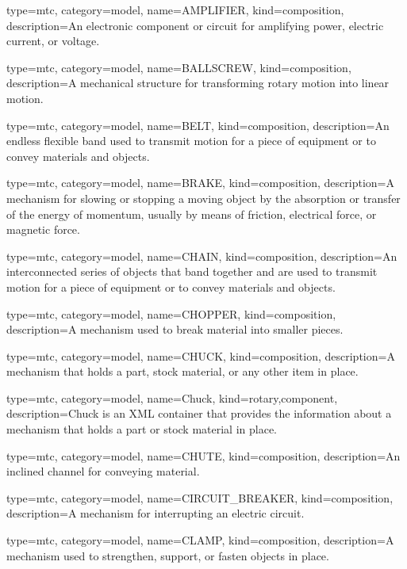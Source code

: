 {
  type=mtc,
  category=model,
  name={AMPLIFIER},
  kind={composition},
  description={An electronic component or circuit for amplifying power, electric current, or voltage.}
}


{
  type=mtc,
  category=model,
  name={BALLSCREW},
  kind={composition},
  description={A mechanical structure for transforming rotary motion into linear motion.}
}


{
  type=mtc,
  category=model,
  name={BELT},
  kind={composition},
  description={An endless flexible band used to transmit motion for a piece of equipment or to convey materials and objects.}
}


{
  type=mtc,
  category=model,
  name={BRAKE},
  kind={composition},
  description={A mechanism for slowing or stopping a moving object by the absorption or transfer of the energy of momentum, usually by means of friction, electrical force, or magnetic force.}
}


{
  type=mtc,
  category=model,
  name={CHAIN},
  kind={composition},
  description={An interconnected series of objects that band together and are used to transmit motion for a piece of equipment or to convey materials and objects.}
}


{
  type=mtc,
  category=model,
  name={CHOPPER},
  kind={composition},
  description={A mechanism used to break material into smaller pieces.}
}


{
  type=mtc,
  category=model,
  name={CHUCK},
  kind={composition},
  description={A mechanism that holds a part, stock material, or any other item in place.}
}


{
  type=mtc,
  category=model,
  name={Chuck},
  kind={rotary,component},
  description={Chuck is an XML container that provides the information about a mechanism that holds a part or stock material in place.}
}


{
  type=mtc,
  category=model,
  name={CHUTE},
  kind={composition},
  description={An inclined channel for conveying material.}
}


{
  type=mtc,
  category=model,
  name={CIRCUIT\_BREAKER},
  kind={composition},
  description={A mechanism for interrupting an electric circuit.}
}


{
  type=mtc,
  category=model,
  name={CLAMP},
  kind={composition},
  description={A mechanism used to strengthen, support, or fasten objects in place.}
}


